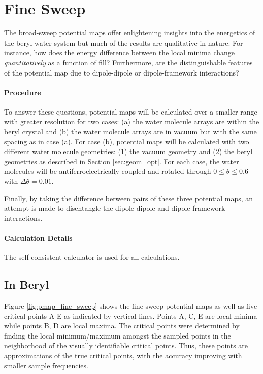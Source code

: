         
        
    \section{Fine Sweep}
    \label{sec:fine_sweep}
    
    The broad-sweep potential maps offer enlightening insights into the energetics of the beryl-water system but much of the results are qualitative in nature. For instance, how does the energy difference between the local minima change \textit{quantitatively} as a function of fill? Furthermore, are the distinguishable features of the potential map due to dipole-dipole or dipole-framework interactions? 
    
    \paragraph{Procedure} To answer these questions, potential maps will be calculated over a smaller range with greater resolution for two cases: (a) the water molecule arrays are within the beryl crystal and (b) the water molecule arrays are in vacuum but with the same spacing as in case (a). For case (b), potential maps will be calculated with two different water molecule geometries: (1) the vacuum geometry and (2) the beryl geometries as described in Section \ref{sec:geom_opt}. For each case, the water molecules will be antiferroelectrically coupled and rotated through $0\le \theta \le 0.6$ with $\Delta \theta = 0.01$. 
    
    Finally, by taking the difference between pairs of these three potential maps, an attempt is made to disentangle the dipole-dipole and dipole-framework interactions.
    
    \paragraph{Calculation Details} The self-consistent calculator is used for all calculations.
    
        \subsection{In Beryl}
        \label{sec:fine_sweep_beryl}
        
        Figure \ref{fig:pmap_fine_sweep} shows the fine-sweep potential maps as well as five critical points A-E as indicated by vertical lines. Points A, C, E are local minima while points B, D are local maxima. The critical points were determined by finding the local minimum/maximum amongst the sampled points in the neighborhood of the visually identifiable critical points. Thus, these points are approximations of the true critical points, with the accuracy improving with smaller sample frequencies. 
        
